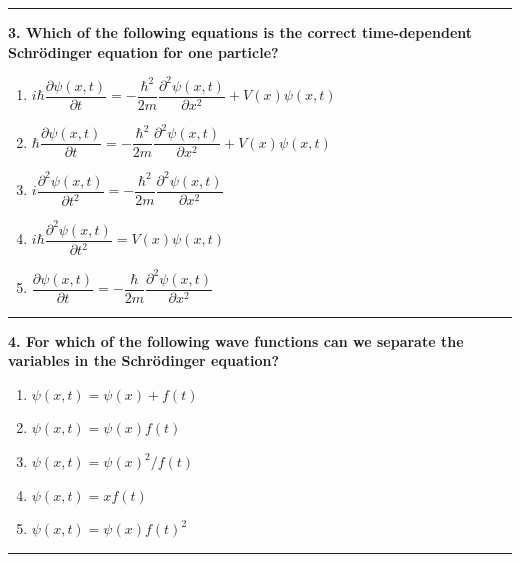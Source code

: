 \documentclass[
  english,
  9pt,
]{extbook}
\providecommand{\tightlist}{%
  \setlength{\itemsep}{0pt}\setlength{\parskip}{0pt}}
\theoremstyle{definition}
\theoremstyle{definition}
\theoremstyle{definition}
\theoremstyle{definition}
\theoremstyle{remark}
\begin{document}
\begin{center}\rule{0.5\linewidth}{0.5pt}\end{center}

\textbf{3. Which of the following equations is the correct time-dependent Schrödinger equation for one particle?}

\begin{enumerate}
\def\labelenumi{\alph{enumi}.}
\tightlist
\item
  \(i\hbar \dfrac{\partial \psi(x,t)}{\partial t} = -\dfrac{\hbar^2}{2m}\dfrac{\partial^2 \psi(x,t)}{\partial x^2} + V(x)\psi(x,t)\)\\
\item
  \(\hbar \dfrac{\partial \psi(x,t)}{\partial t} = -\dfrac{\hbar^2}{2m}\dfrac{\partial^2 \psi(x,t)}{\partial x^2} + V(x)\psi(x,t)\)\\
\item
  \(i \dfrac{\partial^2 \psi(x,t)}{\partial t^2} = -\dfrac{\hbar^2}{2m}\dfrac{\partial^2 \psi(x,t)}{\partial x^2}\)\\
\item
  \(i\hbar \dfrac{\partial^2 \psi(x,t)}{\partial t^2} = V(x)\psi(x,t)\)\\
\item
  \(\dfrac{\partial \psi(x,t)}{\partial t} = -\dfrac{\hbar}{2m}\dfrac{\partial^2 \psi(x,t)}{\partial x^2}\)
\end{enumerate}

\begin{center}\rule{0.5\linewidth}{0.5pt}\end{center}

\textbf{4. For which of the following wave functions can we separate the variables in the Schrödinger equation?}

\begin{enumerate}
\def\labelenumi{\alph{enumi}.}
\tightlist
\item
  \(\psi(x,t) = \psi(x) + f(t)\)\\
\item
  \(\psi(x,t) = \psi(x) f(t)\)\\
\item
  \(\psi(x,t) = \psi(x)^2/f(t)\)\\
\item
  \(\psi(x,t) = x f(t)\)\\
\item
  \(\psi(x,t) = \psi(x) f(t)^2\)
\end{enumerate}

\begin{center}\rule{0.5\linewidth}{0.5pt}\end{center}
\end{document}
